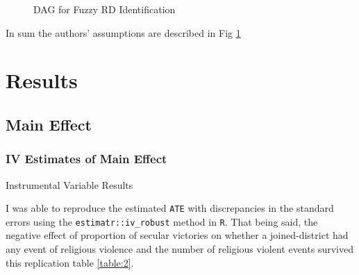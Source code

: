 \documentclass{scrartcl}
\begin{document}
\begin{figure}[h]
  \centering
  \caption{DAG for Fuzzy RD Identification}
  \label{fig:iv-dag}
\end{figure}

In sum the authors' assumptions are described in Fig \ref{fig:iv-dag}

\section{Results}

\subsection{Main Effect}

\subsubsection{IV Estimates of Main Effect}

\begin{table}[ht]
  \begin{center}
    \scalebox{0.75}{
      
    }
    \caption{Instrumental Variable Results}
    \label{table:2}
  \end{center}
\end{table}

I was able to reproduce the estimated \texttt{ATE} with discrepancies in the standard errors using the \texttt{estimatr::iv\_robust} method in \texttt{R}.
That being said, the negative effect of proportion of secular victories on whether a joined-district had any event of religious violence and the number of religious violent events survived this replication table \ref{table:2}.
\end{document}
